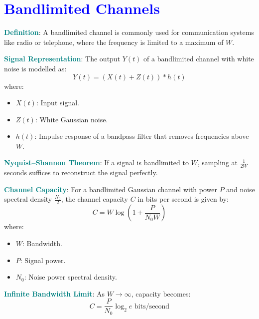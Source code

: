 \section*{\textcolor{blue}{Bandlimited Channels}}

\textbf{\textcolor{teal}{Definition}}: A bandlimited channel is commonly used for communication systems like radio or telephone, where the frequency is limited to a maximum of \( W \).

\textbf{\textcolor{teal}{Signal Representation}}:
The output \( Y(t) \) of a bandlimited channel with white noise is modelled as:
\[
Y(t) = (X(t) + Z(t)) * h(t)
\]
where:
\begin{itemize}
    \item \( X(t) \): Input signal.
    \item \( Z(t) \): White Gaussian noise.
    \item \( h(t) \): Impulse response of a bandpass filter that removes frequencies above \( W \).
\end{itemize}

\textbf{\textcolor{teal}{Nyquist–Shannon Theorem}}: If a signal is bandlimited to \( W \), sampling at \( \frac{1}{2W} \) seconds suffices to reconstruct the signal perfectly.

\textbf{\textcolor{teal}{Channel Capacity}}:
For a bandlimited Gaussian channel with power \( P \) and noise spectral density \( \frac{N_0}{2} \), the channel capacity \( C \) in bits per second is given by:
\[
C = W \log \left(1 + \frac{P}{N_0 W}\right)
\]
where:
\begin{itemize}
    \item \( W \): Bandwidth.
    \item \( P \): Signal power.
    \item \( N_0 \): Noise power spectral density.
\end{itemize}

\textbf{\textcolor{teal}{Infinite Bandwidth Limit}}:
As \( W \to \infty \), capacity becomes:
\[
C = \frac{P}{N_0} \log_2 e \text{ bits/second}
\]

